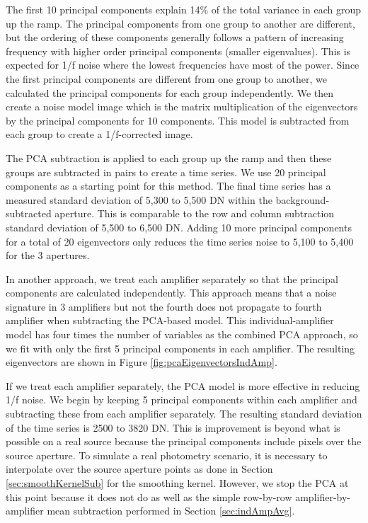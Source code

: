 \documentclass[]{aastex62}
\begin{document}
The first 10 principal components explain 14\% of the total variance in each group up the ramp.
The principal components from one group to another are different, but the ordering of these components generally follows a pattern of increasing frequency with higher order principal components (smaller eigenvalues).
This is expected for 1/f noise where the lowest frequencies have most of the power.
Since the first principal components are different from one group to another, we calculated the principal components for each group independently.
We then create a noise model image which is the matrix multiplication of the eigenvectors by the principal components for 10 components.
This model is subtracted from each group to create a 1/f-corrected image.

The PCA subtraction is applied to each group up the ramp and then these groups are subtracted in pairs to create a time series.
We use 20 principal components as a starting point for this method.
The final time series has a measured standard deviation of 5,300 to 5,500 DN within the background-subtracted aperture.
This is comparable to the row and column subtraction standard deviation of 5,500 to 6,500 DN.
Adding 10 more principal components for a total of 20 eigenvectors only reduces the time series noise to 5,100 to 5,400 for the 3 apertures.


In another approach, we treat each amplifier separately so that the principal components are calculated independently.
This approach means that a noise signature in 3 amplifiers but not the fourth does not propagate to fourth amplifier when subtracting the PCA-based model.
This individual-amplifier model has four times the number of variables as the combined PCA approach, so we fit with only the first 5 principal components in each amplifier.
The resulting eigenvectors are shown in Figure \ref{fig:pcaEigenvectorsIndAmp}.

If we treat each amplifier separately, the PCA model is more effective in reducing 1/f noise.
We begin by keeping 5 principal components within each amplifier and subtracting these from each amplifier separately.
The resulting standard deviation of the time series is 2500 to 3820 DN.
This is improvement is beyond what is possible on a real source because the principal components include pixels over the source aperture.
To simulate a real photometry scenario, it is necessary to interpolate over the source aperture points as done in Section \ref{sec:smoothKernelSub} for the smoothing kernel.
However, we stop the PCA at this point because it does not do as well as the simple row-by-row amplifier-by-amplifier mean subtraction performed in Section \ref{sec:indAmpAvg}.
\end{document}
